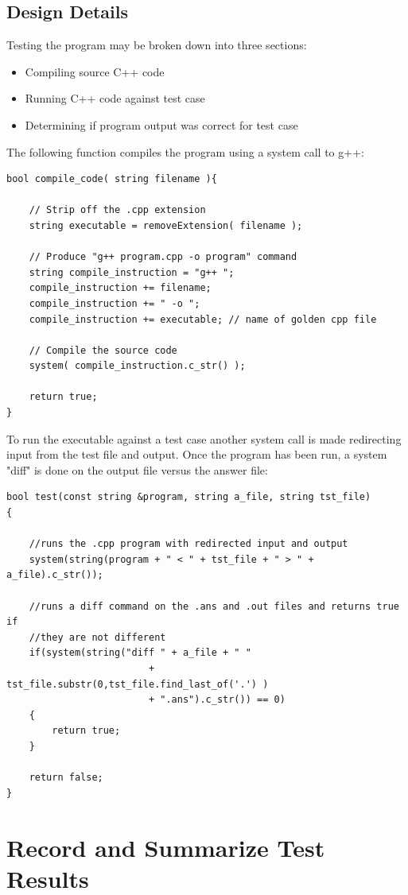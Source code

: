 \subsection{Design Details}
Testing the program may be broken down into three sections:
\begin{itemize}
	\item Compiling source C++ code
	\item Running C++ code against test case
	\item Determining if program output was correct for test case
\end{itemize}
The following function compiles the program using a system call to g++:
\begin{lstlisting}
bool compile_code( string filename ){

    // Strip off the .cpp extension
    string executable = removeExtension( filename );
    
    // Produce "g++ program.cpp -o program" command
    string compile_instruction = "g++ ";
    compile_instruction += filename;
    compile_instruction += " -o ";
    compile_instruction += executable; // name of golden cpp file

    // Compile the source code
    system( compile_instruction.c_str() );

    return true;
}
\end{lstlisting}
To run the executable against a test case another system call is made redirecting input from the test file and output. Once the program has been run, a system "diff" is done on the output file versus the answer file:
\begin{lstlisting}
bool test(const string &program, string a_file, string tst_file)
{

    //runs the .cpp program with redirected input and output
    system(string(program + " < " + tst_file + " > " + a_file).c_str());

    //runs a diff command on the .ans and .out files and returns true if 
    //they are not different
    if(system(string("diff " + a_file + " " 
    					 + tst_file.substr(0,tst_file.find_last_of('.') )
    					 + ".ans").c_str()) == 0)
    {
        return true;
    }

    return false;
}
\end{lstlisting}

\section{Record and Summarize Test Results }

